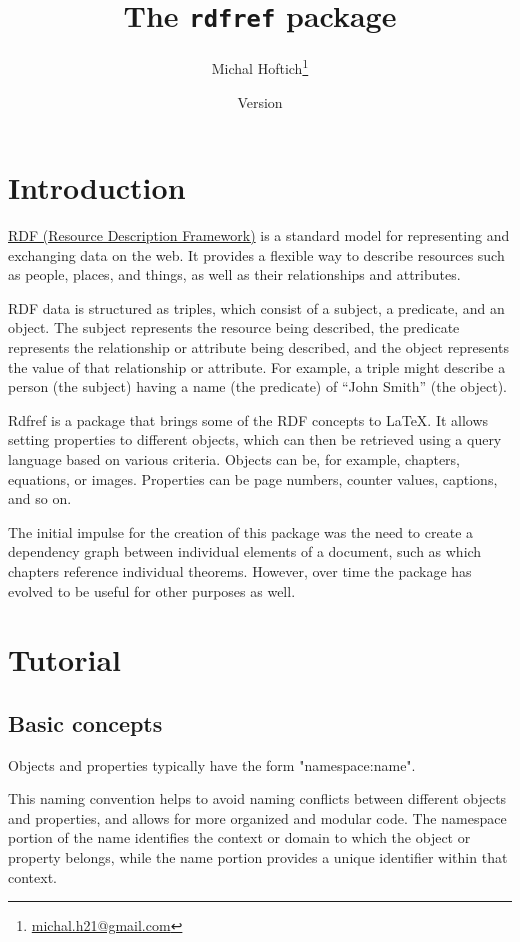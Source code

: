 \documentclass{ltxdoc}
\title{The \texttt{rdfref} package}
\author{Michal Hoftich\footnote{\href{mailto:michal.h21@gmail.com}{michal.h21@gmail.com}}}
\date{Version \version\\\gitdate}
\begin{document}
\maketitle
\tableofcontents

\section{Introduction}

\href{https://en.wikipedia.org/wiki/Resource_Description_Framework}{RDF (Resource Description Framework)}
is a standard model for representing and
exchanging data on the web. It provides a flexible way to describe resources
such as people, places, and things, as well as their relationships and
attributes.

RDF data is structured as triples, which consist of a subject, a predicate, and
an object. The subject represents the resource being described, the predicate
represents the relationship or attribute being described, and the object
represents the value of that relationship or attribute. For example, a triple
might describe a person (the subject) having a name (the predicate) of \enquote{John
Smith} (the object).

Rdfref is a package that brings some of the RDF concepts to \LaTeX. It allows
setting properties to different objects, which can then be retrieved using a
query language based on various criteria. Objects can be, for example,
chapters, equations, or images. Properties can be page numbers, counter values,
captions, and so on.

The initial impulse for the creation of this package was the need to create a
dependency graph between individual elements of a document, such as which
chapters reference individual theorems. However, over time the package has
evolved to be useful for other purposes as well.

\section{Tutorial}


\subsection{Basic concepts}

Objects and properties typically have the form "namespace:name".

This naming convention helps to avoid naming conflicts between different
objects and properties, and allows for more organized and modular code. The
namespace portion of the name identifies the context or domain to which the
object or property belongs, while the name portion provides a unique identifier
within that context.
\end{document}
